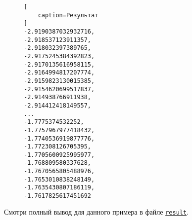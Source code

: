 \begin{figure}[H]
\begin{lstlisting}[
    caption=Результат
]
-2.9190387032932716,
-2.918537123911357,
-2.918032397389765,
-2.9175245384392823,
-2.9170135616958115,
-2.9164994817207774,
-2.9159823130015385,
-2.9154620699517837,
-2.914938766911938,
-2.914412418149557,
...
-1.7775374532252,
-1.7757967977418432,
-1.7740536919877776,
-1.772308126705395,
-1.7705600925995977,
-1.768809580337628,
-1.7670565805488976,
-1.7653010838248149,
-1.7635430807186119,
-1.7617825617451692
\end{lstlisting}
\end{figure}

Смотри полный вывод для данного примера в файле
\href{https://raw.githubusercontent.com/paveloom-p/P12/master/A1/result}{\footnotesize \texttt{result}}.


